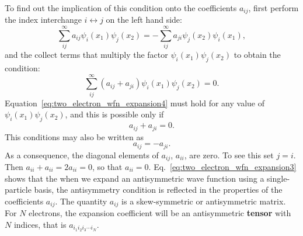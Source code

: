 \documentclass[../Main/chem532-notes.tex]{subfiles}
\begin{document}
\begin{example}
\begin{equation}
\end{equation}
To find out the implication of this condition onto the coefficients $a_{ij}$, first perform the index interchange $i \leftrightarrow j$ on the left hand side:
\begin{equation}
\sum_{ij}^{\infty} a_{ij} \psi_i(x_1) \psi_j(x_2) = -\sum_{ij}^{\infty} a_{ji} \psi_j(x_2) \psi_i(x_1),
\end{equation}
and the collect terms that multiply the factor $\psi_i(x_1) \psi_j(x_2)$ to obtain the condition:
\begin{equation}
\label{eq:two_electron_wfn_expansion4}
\sum_{ij}^{\infty} (a_{ij} + a_{ji}) \psi_i(x_1) \psi_j(x_2) = 0.
\end{equation}
Equation~\eqref{eq:two_electron_wfn_expansion4} must hold for any value of $\psi_i(x_1) \psi_j(x_2)$, and this is possible only if
\begin{equation} \label{eq:two_electron_wfn_expansion3}
a_{ij} + a_{ji} = 0.
\end{equation}
This conditions may also be written as 
\begin{equation}
a_{ij} = - a_{ji}.
\end{equation}
As a consequence, the diagonal elements of $a_{ij}$, $a_{ii}$, are zero.
To see this set $j = i$. Then $a_{ii} + a_{ii} = 2 a_{ii} = 0$, so that $a_{ii} = 0$.
Eq.~\eqref{eq:two_electron_wfn_expansion3} shows that the when we expand an antisymmetric wave function using a single-particle basis, the antisymmetry condition is reflected in the properties of the coefficients $a_{ij}$. The quantity $a_{ij}$ is a skew-symmetric or antisymmetric matrix. For $N$ electrons, the expansion coefficient will be an antisymmetric \textbf{tensor} with $N$ indices, that is $a_{i_1 i_2 i_3 \cdots i_N}$.



\end{example}
\end{document}
